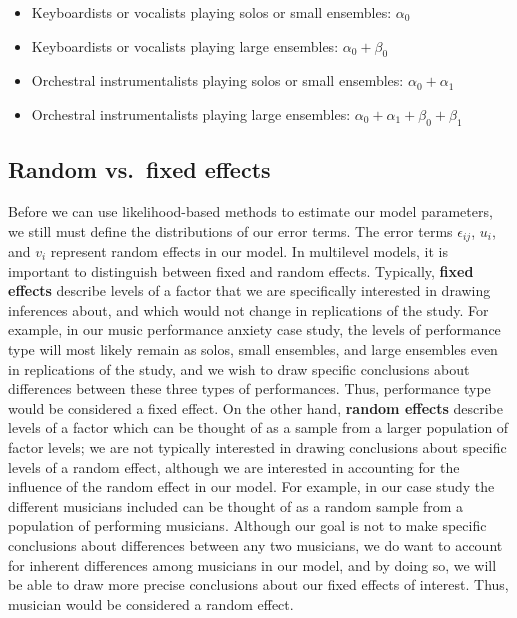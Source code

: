\documentclass[
]{krantz}
\providecommand{\tightlist}{%
  \setlength{\itemsep}{0pt}\setlength{\parskip}{0pt}}
\begin{document}
\begin{itemize}
\tightlist
\item
  Keyboardists or vocalists playing solos or small ensembles: \(\alpha_{0}\)
\item
  Keyboardists or vocalists playing large ensembles: \(\alpha_{0}+\beta_{0}\)
\item
  Orchestral instrumentalists playing solos or small ensembles: \(\alpha_{0}+\alpha_{1}\)
\item
  Orchestral instrumentalists playing large ensembles: \(\alpha_{0}+\alpha_{1}+\beta_{0}+\beta_{1}\)
\end{itemize}

\hypertarget{random-vs.-fixed-effects}{%
\subsection{Random vs.~fixed effects}\label{random-vs.-fixed-effects}}

Before we can use likelihood-based methods to estimate our model parameters, we still must define the distributions of our error terms. The error terms \(\epsilon_{ij}\), \(u_{i}\), and \(v_{i}\) represent random effects in our model. In multilevel models, it is important to distinguish between fixed and random effects. Typically, \textbf{fixed effects} describe levels of a factor that we are specifically interested in drawing inferences about, and which would not change in replications of the study. For example, in our music performance anxiety case study, the levels of performance type will most likely remain as solos, small ensembles, and large ensembles even in replications of the study, and we wish to draw specific conclusions about differences between these three types of performances. Thus, performance type would be considered a fixed effect. On the other hand, \textbf{random effects} describe levels of a factor which can be thought of as a sample from a larger population of factor levels; we are not typically interested in drawing conclusions about specific levels of a random effect, although we are interested in accounting for the influence of the random effect in our model. For example, in our case study the different musicians included can be thought of as a random sample from a population of performing musicians. Although our goal is not to make specific conclusions about differences between any two musicians, we do want to account for inherent differences among musicians in our model, and by doing so, we will be able to draw more precise conclusions about our fixed effects of interest. Thus, musician would be considered a random effect.
\end{document}
